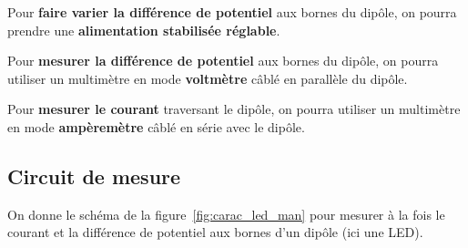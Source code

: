 \medskip

Pour \textbf{faire varier la différence de potentiel} aux bornes du dipôle, on pourra prendre une \textbf{alimentation stabilisée réglable}.

Pour \textbf{mesurer la différence de potentiel} aux bornes du dipôle, on pourra utiliser un multimètre en mode \textbf{voltmètre} câblé en parallèle du dipôle.

Pour \textbf{mesurer le courant} traversant le dipôle, on pourra utiliser un multimètre en mode \textbf{ampèremètre} câblé en série avec le dipôle.

\subsection{Circuit de mesure}

On donne le schéma de la figure~\ref{fig:carac_led_man} pour mesurer à la fois le courant et la différence de potentiel aux bornes d'un dipôle (ici une LED).

\bigskip

